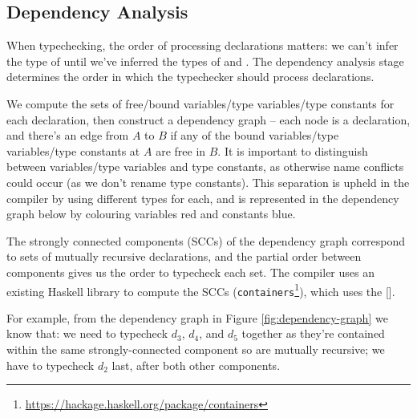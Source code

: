 \documentclass[dissertation.tex]{subfiles}
\begin{document}
{{{        }
        \subsection{Dependency Analysis}\label{sec:dependency-analysis}
        {

            When typechecking, the order of processing declarations matters: we can't infer the type of  until we've inferred the types of  and . The dependency analysis stage
            determines the order in which the typechecker should process declarations.

            We compute the sets of free/bound variables/type variables/type constants for each declaration, then
            construct a dependency graph -- each node is a declaration, and there's an edge from \(A\) to \(B\) if any
            of the bound variables/type variables/type constants at \(A\) are free in \(B\). It is important to
            distinguish between variables/type variables and type constants, as otherwise name conflicts could occur (as
            we don't rename type constants). This separation is upheld in the compiler by using different types for
            each, and is represented in the dependency graph below by colouring variables red and constants blue.

            The strongly connected components (SCCs) of the dependency graph correspond to sets of mutually recursive
            declarations, and the partial order between components gives us the order to typecheck each set. The
            compiler uses an existing Haskell library to compute the SCCs
            (\texttt{containers}\footnote{\url{https://hackage.haskell.org/package/containers}}), which uses the [].

            
            For example, from the dependency graph in Figure \ref{fig:dependency-graph} we know that: we need to
            typecheck \(d_3\), \(d_4\), and \(d_5\) together as they're contained within the same strongly-connected
            component so are mutually recursive; we have to typecheck \(d_2\) last, after both other components.

}}}
\end{document}
